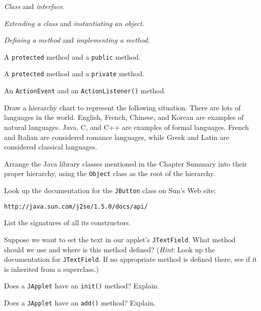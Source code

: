 \begin{EXRtwo}
\begin{EXRtwoLL}
\item  {\it Class} and {\it interface}.
\item  {\it Extending a class} and {\it instantiating an object}.
\item  {\it Defining a method} and {\it implementing a method}.
\item  A {\tt protected} method and a {\tt public} method.
\item  A {\tt protected} method and a {\tt private} method.
\item  An {\tt ActionEvent} and an {\tt ActionListener()} method.
\end{EXRtwoLL}


\item  Draw a hierarchy chart to represent the following situation.
There are lots of languages in the world.  English, French, Chinese,
and Korean are examples of natural languages.  Java, C, and C++ are
examples of formal languages.  French and Italian are considered
romance languages, while Greek and Latin are considered classical
languages.

\item  Arrange the Java library classes mentioned in the
Chapter Summary into their proper hierarchy, using the
{\tt Object} class as the root of the hierarchy.

\item  Look up the documentation for the {\tt JButton} class
on Sun's Web site:

\begin{jjjlisting}
\begin{lstlisting}[commentstyle=\color{black}]
http://java.sun.com/j2se/1.5.0/docs/api/
\end{lstlisting}
\end{jjjlisting}

\noindent List the signatures of all its constructors.

\item  Suppose we want to set the text in our applet's {\tt JTextField}.
What method should we use and where is this method defined? ({\it Hint}:
Look up the documentation for {\tt JTextField}. If no appropriate
method is defined there, see if it is inherited from a superclass.)

\item  Does a {\tt JApplet} have an {\tt init()} method? Explain.

\item  Does a {\tt JApplet} have an {\tt add()} method? Explain.


\end{EXRtwo}
